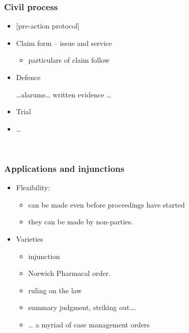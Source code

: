 \documentclass[ignorenonframetext,]{beamer}
\begin{document}
\begin{frame}
\frametitle{Civil process}

\begin{itemize}
\item  {[}pre-action protocol{]}
\item  Claim form -- issue and service

  \begin{itemize}
  \item    particulars of claim follow
  \end{itemize}
\item  Defence

  {}\ldots{}{alarums\ldots{}}{ }{written}{ }{evidence}{ \ldots{}}
\item  Trial
\item  \ldots{}
\end{itemize}

~


\end{frame}

\begin{frame}
\frametitle{Applications and injunctions}

\begin{itemize}
\item  Flexibility:

  \begin{itemize}
  \item    can be made even before proceedings have started
  \item    they can be made by non-parties.
  \end{itemize}
\item  Varieties

  \begin{itemize}
  \item    injunction
  \item    Norwich Pharmacal order.
  \item    ruling on the law
  \item    summary judgment, striking out\ldots{}.
  \item    \ldots{} a myriad of case management orders
  \end{itemize}
\end{itemize}

~


\end{frame}
\end{document}
